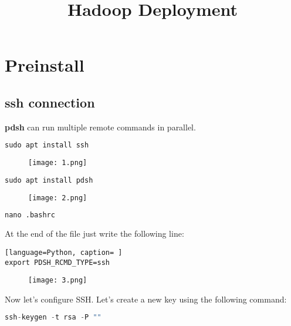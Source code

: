 \documentclass[onecolumn]{article}
\title{Hadoop Deployment}
\begin{document}
\maketitle

\tableofcontents

\section{Preinstall}


\subsection{ssh connection}

\textbf{pdsh} can run multiple remote commands in parallel. 

\begin{lstlisting}[language=Python, caption= Install SSH and PDSH]
sudo apt install ssh
\end{lstlisting}

\begin{figure}[ht!]
\centering
\texttt{[image: 1.png]}
\caption{\label{}}
\end{figure}

\begin{lstlisting}[language=Python, caption= Install SSH and PDSH]
sudo apt install pdsh
\end{lstlisting}

\begin{figure}[ht!]
\centering
\texttt{[image: 2.png]}
\caption{\label{}}
\end{figure}

\begin{lstlisting}[language=Python, caption= Install PDSH]
nano .bashrc
\end{lstlisting}

At the end of the file just write the following line:
\begin{lstlisting}[language=Python, caption= ]
export PDSH_RCMD_TYPE=ssh
\end{lstlisting}

\begin{figure}[ht!]
\centering
\texttt{[image: 3.png]}
\caption{\label{}}
\end{figure}


Now let’s configure SSH. Let’s create a new key using the following command:

\begin{lstlisting}[language=Python, caption= ssh-keygen]
ssh-keygen -t rsa -P ""
\end{lstlisting}
\end{document}
